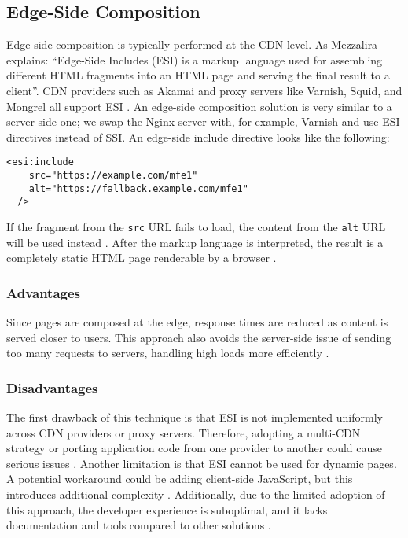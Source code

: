 \subsection{Edge-Side Composition}
Edge-side composition is typically performed at the CDN level. As Mezzalira \cite{MezzaliraBuildingMf} explains: ``Edge-Side Includes (ESI) is a markup language used for assembling different HTML fragments into an HTML page and serving the final result to a client''. CDN providers such as Akamai and proxy servers like Varnish, Squid, and Mongrel all support ESI \cite{Geers}. An edge-side composition solution is very similar to a server-side one; we swap the Nginx server with, for example, Varnish and use ESI directives instead of SSI. An edge-side include directive looks like the following:
\begin{lstlisting}[caption={Example of edge-side composition using ESI}]
  <esi:include 
    src="https://example.com/mfe1" 
    alt="https://fallback.example.com/mfe1" 
  />
\end{lstlisting}
If the fragment from the \texttt{src} URL fails to load, the content from the \texttt{alt} URL will be used instead \cite{Geers}. After the markup language is interpreted, the result is a completely static HTML page renderable by a browser \cite{MezzaliraBuildingMf}.

\subsubsection{Advantages}
Since pages are composed at the edge, response times are reduced as content is served closer to users. This approach also avoids the server-side issue of sending too many requests to servers, handling high loads more efficiently \cite{MezzaliraBuildingMf}.

\subsubsection{Disadvantages}
The first drawback of this technique is that ESI is not implemented uniformly across CDN providers or proxy servers. Therefore, adopting a multi-CDN strategy or porting application code from one provider to another could cause serious issues \cite{Peltonen}. Another limitation is that ESI cannot be used for dynamic pages. A potential workaround could be adding client-side JavaScript, but this introduces additional complexity \cite{MezzaliraBuildingMf}. Additionally, due to the limited adoption of this approach, the developer experience is suboptimal, and it lacks documentation and tools compared to other solutions \cite{MezzaliraBuildingMf}.

